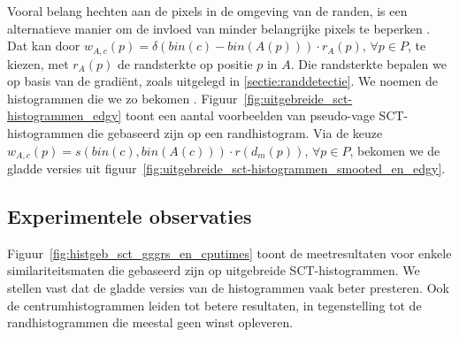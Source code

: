 Vooral belang hechten aan de pixels in de omgeving van de randen, is een alternatieve
manier om de invloed van minder belangrijke pixels te beperken 
\cite{vertan:upgrading_color_distribution_for_ir}. Dat kan door 
$w_{A,c}(p)=\delta(bin(c)-bin(A(p))) \cdot r_{A}(p)$, $\forall p \in P$, te kiezen, met $r_{A}(p)$ de randsterkte op positie $p$ in $A$.
Die randsterkte bepalen we op basis van de gradi\"ent, zoals uitgelegd in \ref{sectie:randdetectie}.  
We noemen de histogrammen die we zo bekomen . 
Figuur~\ref{fig:uitgebreide_sct-histogrammen_edgy} toont een aantal voorbeelden van
pseudo-vage SCT-histogrammen die gebaseerd zijn op een randhistogram.
Via de keuze $w_{A,c}(p)=s(bin(c),bin(A(c))) \cdot r(d_m(p))$, $\forall p \in P$, 
bekomen we de gladde versies uit
figuur~\ref{fig:uitgebreide_sct-histogrammen_smooted_en_edgy}. 



\subsection{Experimentele observaties}

Figuur~\ref{fig:histgeb_sct_gggrs_en_cputimes} toont de meetresultaten voor enkele
similariteitsmaten die gebaseerd zijn op uitgebreide SCT-histogrammen. We stellen
vast dat de gladde versies van de histogrammen vaak beter presteren. Ook de
centrumhistogrammen leiden tot betere resultaten, in tegenstelling tot de randhistogrammen
die meestal geen winst opleveren.

